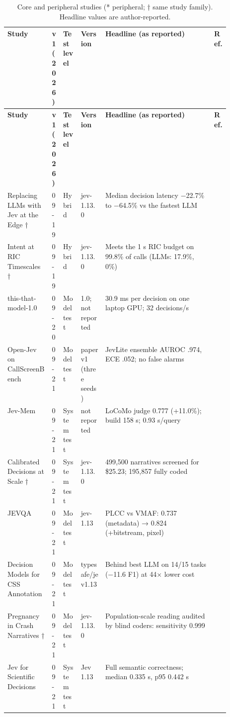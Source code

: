 {\footnotesize
\begin{xltabular}{\linewidth}{p{0.2\linewidth}p{0.055\linewidth}p{0.085\linewidth}p{0.11\linewidth}Xp{0.075\linewidth}}
\caption{Core and peripheral studies (* peripheral; † same study family). Headline values are author-reported.}\label{tab:core}\\
\toprule
\textbf{Study} & \textbf{v1 (2026)} & \textbf{Test level} & \textbf{Version} & \textbf{Headline (as reported)} & \textbf{Ref.} \\
\midrule
\endfirsthead
\toprule
\textbf{Study} & \textbf{v1 (2026)} & \textbf{Test level} & \textbf{Version} & \textbf{Headline (as reported)} & \textbf{Ref.} \\
\midrule
\endhead
Replacing LLMs with Jev at the Edge † & 09-19 & Hybrid & jev-1.13.0 & Median decision latency −22.7\% to −64.5\% vs the fastest LLM & \citep{arxiv2609_22753} \\
Intent at RIC Timescales † & 09-19 & Hybrid & jev-1.13.0 & Meets the 1 s RIC budget on 99.8\% of calls (LLMs: 17.9\%, 0\%) & \citep{arxiv2609_23136} \\
this-that-model-1.0 & 09-20 & Model test & 1.0; not reported & 30.9 ms per decision on one laptop GPU; 32 decisions/\allowbreak{}s & \citep{arxiv2609_23886} \\
Open-Jev on CallScreenBench & 09-21 & Model test & paper v1 (three seeds) & JevLite ensemble AUROC .974, ECE .052; no false alarms & \citep{arxiv2609_23959} \\
Jev-Mem & 09-21 & System test & not reported & LoCoMo judge 0.777 (+11.0\%); build 158 s; 0.93 s/\allowbreak{}query & \citep{arxiv2609_23986} \\
Calibrated Decisions at Scale † & 09-21 & System test & jev-1.13.0 & 499,500 narratives screened for \$25.23; 195,857 fully coded & \citep{arxiv2609_24052} \\
JEVQA & 09-21 & Model test & jev-1.13 & PLCC vs VMAF: 0.737 (metadata) → 0.824 (+bitstream, pixel) & \citep{arxiv2609_24395} \\
Decision Models for CSS Annotation & 09-21 & Model test & typesafe/\allowbreak{}jev1.13 & Behind best LLM on 14/\allowbreak{}15 tasks (−11.6 F1) at 44× lower cost & \citep{arxiv2609_24574} \\
Pregnancy in Crash Narratives † & 09-21 & Model test & jev-1.13.0 & Population-scale reading audited by blind coders: sensitivity 0.999 & \citep{arxiv2610_00213} \\
Jev for Scientific Decisions & 09-21 & System test & Jev 1.13 & Full semantic correctness; median 0.335 s, p95 0.442 s & \citep{arxiv2609_24965} \\

\end{xltabular}}
